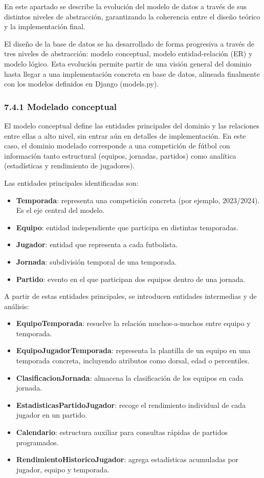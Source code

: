 En este apartado se describe la evolución del modelo de datos a través de sus
distintos niveles de abstracción, garantizando la coherencia entre el diseño
teórico y la implementación final.
 
El diseño de la base de datos se ha desarrollado de forma progresiva a través de
tres niveles de abstracción: modelo conceptual, modelo entidad-relación (ER) y
modelo lógico. Esta evolución permite partir de una visión general del dominio
hasta llegar a una implementación concreta en base de datos, alineada finalmente
con los modelos definidos en Django (models.py).
 
\subsubsection{7.4.1 Modelado conceptual}
El modelo conceptual define las entidades principales del dominio y las
relaciones entre ellas a alto nivel, sin entrar aún en detalles de
implementación. En este caso, el dominio modelado corresponde a una competición
de fútbol con información tanto estructural (equipos, jornadas, partidos) como
analítica (estadísticas y rendimiento de jugadores).
 
Las entidades principales identificadas son:
 
\begin{itemize}
\item \textbf{Temporada}: representa una competición concreta (por ejemplo,
2023/2024). Es el eje central del modelo.
\item \textbf{Equipo}: entidad independiente que participa en distintas
temporadas.
\item \textbf{Jugador}: entidad que representa a cada futbolista.
\item \textbf{Jornada}: subdivisión temporal de una temporada.
\item \textbf{Partido}: evento en el que participan dos equipos dentro de una
jornada.
\end{itemize}
 
A partir de estas entidades principales, se introducen entidades intermedias y
de análisis:
 
\begin{itemize}
\item \textbf{EquipoTemporada}: resuelve la relación muchos-a-muchos entre
equipo y temporada.
\item \textbf{EquipoJugadorTemporada}: representa la plantilla de un equipo en
una temporada concreta, incluyendo atributos como dorsal, edad o percentiles.
\item \textbf{ClasificacionJornada}: almacena la clasificación de los equipos
en cada jornada.
\item \textbf{EstadisticasPartidoJugador}: recoge el rendimiento individual de
cada jugador en un partido.
\item \textbf{Calendario}: estructura auxiliar para consultas rápidas de
partidos programados.
\item \textbf{RendimientoHistoricoJugador}: agrega estadísticas acumuladas por
jugador, equipo y temporada.
\end{itemize}
 
